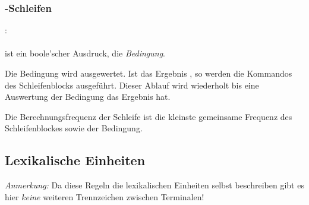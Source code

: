 
\subsubsection{-Schleifen}\label{$_backslash$kw__while__-Schleifen}
:\label{schleife_while}\\
\hspace*{1cm}\Gspace\Gt{(}\Gspace{} \Gspace\Gt{)}\Gspace\Gt{\{}\Gspace{} \Gspace\Gt{\}}\\

\glq{}\grq ist ein boole'scher Ausdruck, die \emph{Bedingung}.

Die Bedingung wird ausgewertet. Ist das Ergebnis , so werden die Kommandos des Schleifenblocks
ausgeführt. Dieser Ablauf wird wiederholt bis eine Auswertung der Bedingung das Ergebnis  hat.

Die Berechnungsfrequenz der Schleife ist die kleinste gemeinsame Frequenz des Schleifenblockes sowie der Bedingung.

\subsection{Lexikalische Einheiten}\label{Lexikalische Einheiten}

\emph{Anmerkung:} Da diese Regeln die lexikalischen Einheiten selbst beschreiben gibt es
hier \emph{keine} weiteren Trennzeichen zwischen Terminalen!


